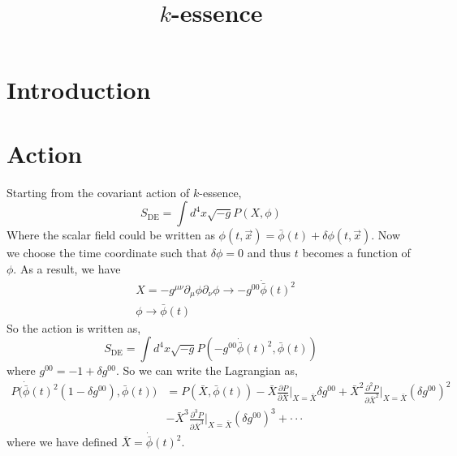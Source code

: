 \documentclass[a4paper,11pt]{article}
\title{$k$-essence}
\def\be{\begin{equation}}
\def\ee{\end{equation}}
\newcommand{\MP}{M_{\rm Pl}}
\begin{document}
\maketitle

\section{Introduction}


\section{Action}

Starting from the covariant action of $k$-essence,
\be
S_{\mathrm{DE}}=\int d^{4} x \sqrt{-g} P(X, \phi)
\ee
Where the scalar field could be written as $\phi(t, \vec{x})=\bar{\phi}(t)+\delta \phi(t, \vec{x})$. Now we choose the time coordinate  such that $\delta \phi = 0$ and thus $t$ becomes a function of $\phi$. As a result, we have
\begin{align}
& X = - g^{\mu \nu} \partial_{\mu} \phi \partial_{\nu} \phi \to -g^{00} \dot{\bar{\phi}}(t)^2 \\ \nonumber &
\phi \to \bar{\phi}(t)
\end{align}
So the action is written as,
\be
S_{\mathrm{DE}}=\int d^{4} x \sqrt{-g} P(-g^{00} \dot{\bar{\phi}}(t)^2, \bar{\phi}(t))
\ee
where $g^{00} = -1 + \delta g^{00} $. So we can write the Lagrangian as,
\begin{align}
P \Big( \dot{\bar{\phi}}(t)^2 (1 - \delta g^{00}), \bar{\phi}(t) \Big)  & = P( \bar{X}, \bar{\phi}(t)) -  \bar{X} \frac{\partial P} {\partial \bar{X}}\bigg|_{X=\bar{X}}  \delta g^{00}  +  \bar{X}^2\frac{\partial^2 P} {\partial \bar{X}^2}\bigg|_{X=\bar{X}}  ( \delta g^{00} )^2 \nonumber  \\ &  -   \bar{X}^3\frac{\partial^3 P} {\partial \bar{X}^3}\bigg|_{X=\bar{X}}  ( \delta g^{00} )^3 + \cdot \cdot \cdot
\end{align}
where we have defined $\bar{X} =\dot{\bar{\phi}}(t)^2 $.

\end{document}
